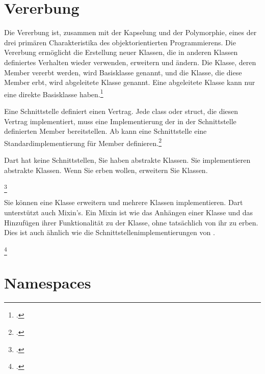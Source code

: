 \section{Vererbung}

Die Vererbung ist, zusammen mit der Kapselung und der Polymorphie, eines der drei primären Charakteristika des objektorientierten Programmierens. Die Vererbung ermöglicht die Erstellung neuer Klassen, die in anderen Klassen definiertes Verhalten wieder verwenden, erweitern und ändern. Die Klasse, deren Member vererbt werden, wird Basisklasse genannt, und die Klasse, die diese Member erbt, wird abgeleitete Klasse genannt. Eine abgeleitete Klasse kann nur eine direkte Basisklasse haben.\footcite[Vgl.  veerbung
][Abgerufen am \today]{GoogleFlutterSharedPreferences2020} 

Eine Schnittstelle definiert einen Vertrag. Jede class oder struct, die diesen Vertrag implementiert, muss eine Implementierung der in der Schnittstelle definierten Member bereitstellen. Ab  kann eine Schnittstelle eine Standardimplementierung für Member definieren.\footcite[Vgl. interface (\Csharp-Referenz)][Abgerufen am \today]{GoogleFlutterSharedPreferences2020} 

Dart hat keine Schnittstellen, Sie haben abstrakte Klassen. Sie implementieren abstrakte Klassen. Wenn Sie erben wollen, erweitern Sie Klassen.

\begin{minipage}{\linewidth}

\end{minipage}
\footcitetext[In Anlehnung an ][Abgerufen am \today]{Pedley2019}

Sie können eine Klasse erweitern und mehrere Klassen implementieren. Dart unterstützt auch Mixin's. Ein Mixin ist wie das Anhängen einer Klasse und das Hinzufügen ihrer Funktionalität zu der Klasse, ohne tatsächlich von ihr zu erben. Dies ist auch ähnlich wie die Schnittstellenimplementierungen von .

\begin{minipage}{\linewidth}

\end{minipage}
\footcitetext[In Anlehnung an ][Abgerufen am \today]{Pedley2019}

\section{Namespaces}

